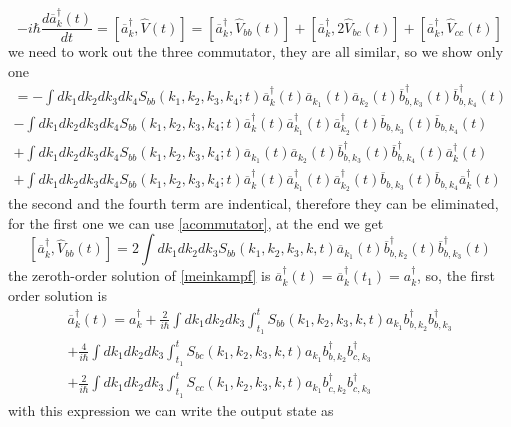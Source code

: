 \begin{equation}\label{meinkampf}-i\hbar \frac{d\overline{a}^\dagger_{k}(t)}{dt} = [\overline{a}^\dagger_{k},\hat{V}(t)] = [\overline{a}^\dagger_{k},\hat{V}_{bb}(t)] + [\overline{a}^\dagger_{k},2\hat{V}_{bc}(t)] +[\overline{a}^\dagger_{k},\hat{V}_{cc}(t)]\end{equation}
we need to work out the three commutator, they are all  similar, so we show only one
\begin{multline}[\overline{a}^\dagger_{k},\hat{V}_{bb}(t)] = -\int dk_1dk_2dk_3dk_4S_{bb}(k_1,k_2,k_3,k_4;t)\overline{a}^\dagger_{k}(t)\overline{a}_{k_1}(t)\overline{a}_{k_2}(t)\overline{b}_{b,k_3}^\dagger(t) \overline{b}_{b,k_4}^\dagger(t) \\
-\int dk_1dk_2dk_3dk_4S_{bb}(k_1,k_2,k_3,k_4;t)\overline{a}^\dagger_{k}(t)\overline{a}^\dagger_{k_1}(t)\overline{a}^\dagger_{k_2}(t)\overline{b}_{b,k_3}(t) \overline{b}_{b,k_4}(t) \\
+ \int dk_1dk_2dk_3dk_4S_{bb}(k_1,k_2,k_3,k_4;t)\overline{a}_{k_1}(t)\overline{a}_{k_2}(t)\overline{b}_{b,k_3}^\dagger(t) \overline{b}_{b,k_4}^\dagger(t)\overline{a}^\dagger_{k}(t)\\ 
+ \int dk_1dk_2dk_3dk_4S_{bb}(k_1,k_2,k_3,k{}_4;t)\overline{a}^\dagger_{k}(t)\overline{a}^\dagger_{k_1}(t)\overline{a}^\dagger_{k_2}(t)\overline{b}_{b,k_3}(t) \overline{b}_{b,k_4}\overline{a}^\dagger_{k}(t) \end{multline}
the second and the fourth term are indentical, therefore they can be eliminated, for the first one we can use \eqref{acommutator}, at the end we get
\[[\overline{a}^\dagger_{k},\hat{V}_{bb}(t)] = 2\int dk_1 dk_2 dk_3 S_{bb}(k_1,k_2,k_3,k,t)\overline{a}_{k_1}(t)\overline{b}_{b,k_2}^\dagger(t)\overline{b}_{b,k_3}^\dagger(t)\]
the zeroth-order solution of \eqref{meinkampf} is $\overline{a}^\dagger_{k}(t) = \overline{a}^\dagger_{k}(t_1) = a_k^\dagger$, so, the first order solution is
\begin{multline}\label{abarra}\overline{a}^\dagger_{k}(t) = a_k^\dagger + \frac{2}{i\hbar}\int dk_1dk_2 dk_3 \int_{t_1}^tS_{bb}(k_1,k_2,k_3,k,t)a_{k_1}b_{b,k_2}^\dagger b_{b,k_3}^\dagger \\+\frac{4}{i\hbar}\int dk_1dk_2 dk_3 \int_{t_1}^tS_{bc}(k_1,k_2,k_3,k,t)a_{k_1}b_{b,k_2}^\dagger b_{c,k_3}^\dagger \\
+ \frac{2}{i\hbar}\int dk_1dk_2 dk_3 \int_{t_1}^tS_{cc}(k_1,k_2,k_3,k,t)a_{k_1}b_{c,k_2}^\dagger b_{c,k_3}^\dagger \end{multline}
with this expression we can write the output state as
